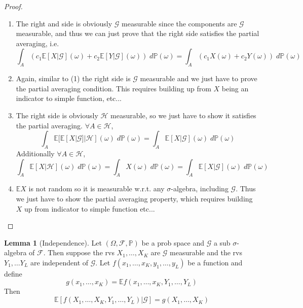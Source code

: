 \documentclass[11pt]{article}
\theoremstyle{definition}
\theoremstyle{definition}
\newtheorem{lemma}[theorem]{Lemma}
\theoremstyle{definition}
\theoremstyle{remark}
\begin{document}
\begin{proof} \leavevmode
    \begin{enumerate}
        \item The right and side is obviously $\mathcal{G}$ measurable since the components are $\mathcal{G}$ measurable,
        and thus we can just prove that the right side satisfies the partial averaging, i.e.
        \[
            \int_A (c_1 \mathbb{E}[X | \mathcal{G}](\omega) + c_2 \mathbb{E} [ Y | \mathcal{G}](\omega)) \; d \mathbb{P}(\omega) = 
            \int_A (c_1 X(\omega) + c_2 Y(\omega)) \; d \mathbb{P}(\omega)
        \]   

        \item Again, similar to (1) the right side is $\mathcal{G}$ measurable and we just have to prove the partial averaging condition.
        This requires building up from $X$ being an indicator to simple function, etc...

        \item The right side is obviously $\mathcal{H}$ measurable, so we just have to show it satisfies the partial averaging.
        $\forall A \in \mathcal{H}$, 
        \[
            \int_A \mathbb{E}[\mathbb{E}[X | \mathcal{G}] | \mathcal{H}](\omega) \; d \mathbb{P}(\omega) = \int_A \mathbb{E}[X | \mathcal{G}](\omega) \; d \mathbb{P}(\omega)
        \] 
        Additionally $\forall A \in \mathcal{H}$,
        \[
            \int_A \mathbb{E}[X | \mathcal{H}](\omega) \; d\mathbb{P}(\omega) = \int_A X(\omega) \; d \mathbb{P}(\omega) = \int_A \mathbb{E}[X | \mathcal{G}](\omega) \; d\mathbb{P}(\omega)
        \] 

        \item $\mathbb{E} X $ is not random so it is measurable w.r.t. any $\sigma$-algebra, including $\mathcal{G}$. Thus
        we just have to show the partial averaging property, which requires building $X$ up from indicator to simple function etc...
    \end{enumerate}
\end{proof}

\begin{lemma}[Independence]
    Let $(\Omega, \mathcal{F}, \mathbb{P})$ be a prob space and $\mathcal{G}$ a sub $\sigma$-algebra of $\mathcal{F}$.
    Then suppose the rvs $X_1, \dots, X_K$ are $\mathcal{G}$ measurable and the rvs $Y_1, \dots Y_L$ are independent of $\mathcal{G}$.
    Let $f(x_1, \dots, x_K, y_1, \dots, y_L)$ be a function and define
    \[
        g(x_1, \dots, x_K) = \mathbb{E}f(x_1, \dots, x_K, Y_1, \dots, Y_L)
    \]         
    Then
    \[
        \mathbb{E}[f(X_1, \dots, X_K, Y_1, \dots, Y_L) | \mathcal{G}] = g(X_1, \dots, X_K)
    \] 
\end{lemma}
\end{document}
